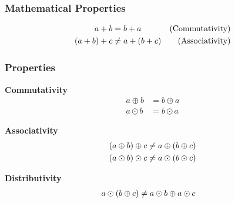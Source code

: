 \begin{frame}

\frametitle{Mathematical Properties}

\begin{align*}
a + b &= b + a & \text{(Commutativity)} \\
 \mathopen{}\left(a + b\right)\mathclose{}  + c &\neq a +  \mathopen{}\left(b + c\right)\mathclose{}  & \text{(Associativity)}
\end{align*}

\end{frame}

\begin{frame}

\frametitle{Properties}

\vspace{\fill}

\begin{center}

\begin{minipage}{0.5\textwidth}
\begin{center}
\textbf{Commutativity} \begin{align*}
a \oplus b &= b \oplus a \\
a \odot b &= b \odot a
\end{align*}
\end{center}
\end{minipage}%
\begin{minipage}{0.5\textwidth}
\begin{center}
\textbf{Associativity}~\frownie \begin{align*}
 \mathopen{}\left(a \oplus b\right)\mathclose{}  \oplus c &\neq a \oplus  \mathopen{}\left(b \oplus c\right)\mathclose{}  \\
 \mathopen{}\left(a \odot b\right)\mathclose{}  \odot c &\neq a \odot  \mathopen{}\left(b \odot c\right)\mathclose{} 
\end{align*}
\end{center}
\end{minipage}

\vspace{\fill}

\textbf{Distributivity}~\frownie \begin{align*}
a \odot  \mathopen{}\left(b \oplus c\right)\mathclose{}  &\neq a \odot b \oplus a \odot c
\end{align*}

\end{center}

\vspace{\fill}

\end{frame}
